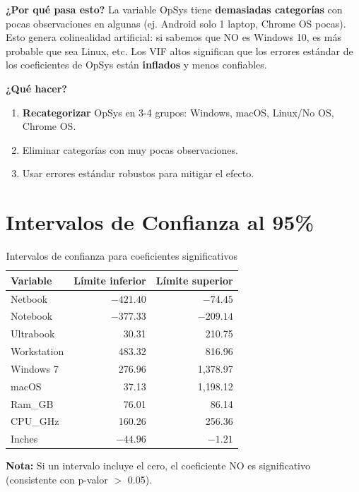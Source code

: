 \documentclass[12pt,a4paper]{article}
\begin{document}
\textbf{¿Por qué pasa esto?} La variable OpSys tiene \textbf{demasiadas categorías} con pocas observaciones en algunas (ej. Android solo 1 laptop, Chrome OS pocas). Esto genera colinealidad artificial: si sabemos que NO es Windows 10, es más probable que sea Linux, etc. Los VIF altos significan que los errores estándar de los coeficientes de OpSys están \textbf{inflados} y menos confiables.

\textbf{¿Qué hacer?}
\begin{enumerate}
    \item \textbf{Recategorizar} OpSys en 3-4 grupos: Windows, macOS, Linux/No OS, Chrome OS.
    \item Eliminar categorías con muy pocas observaciones.
    \item Usar errores estándar robustos para mitigar el efecto.
\end{enumerate}

\section{Intervalos de Confianza al 95\%}

\begin{table}[H]
\centering
\caption{Intervalos de confianza para coeficientes significativos}
\begin{tabular}{lrr}
\toprule
\textbf{Variable} & \textbf{Límite inferior} & \textbf{Límite superior} \\
\midrule
Netbook & $-421.40$ & $-74.45$ \\
Notebook & $-377.33$ & $-209.14$ \\
Ultrabook & 30.31 & 210.75 \\
Workstation & 483.32 & 816.96 \\
Windows 7 & 276.96 & 1{,}378.97 \\
macOS & 37.13 & 1{,}198.12 \\
Ram\_GB & 76.01 & 86.14 \\
CPU\_GHz & 160.26 & 256.36 \\
Inches & $-44.96$ & $-1.21$ \\
\bottomrule
\end{tabular}
\end{table}

\textbf{Nota:} Si un intervalo incluye el cero, el coeficiente NO es significativo (consistente con p-valor $>$ 0.05).
\end{document}
